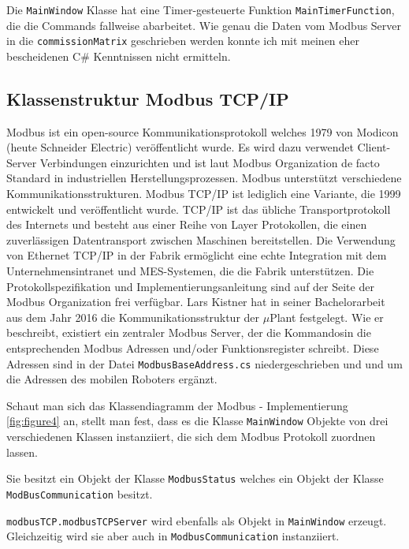 Die \verb|MainWindow| Klasse hat eine Timer-gesteuerte Funktion \verb|MainTimerFunction|, die die Commands
fallweise abarbeitet.
Wie genau die Daten vom Modbus Server in die \verb|commissionMatrix| geschrieben werden konnte ich mit meinen eher
bescheidenen C$\#$ Kenntnissen nicht ermitteln.
\newpage

\subsection{Klassenstruktur Modbus TCP/IP}\label{ModbusChapter}

Modbus ist ein open-source Kommunikationsprotokoll welches 1979 von Modicon (heute Schneider Electric) veröffentlicht wurde.
Es wird dazu verwendet Client-Server Verbindungen einzurichten und ist laut Modbus Organization de facto Standard in
industriellen Herstellungsprozessen.
Modbus unterstützt verschiedene Kommunikationsstrukturen.
Modbus TCP/IP ist lediglich eine Variante, die 1999 entwickelt und veröffentlicht wurde.
TCP/IP ist das übliche Transportprotokoll des Internets und besteht aus einer Reihe von Layer Protokollen, die einen
zuverlässigen Datentransport zwischen Maschinen bereitstellen.
Die Verwendung von Ethernet TCP/IP in der Fabrik ermöglicht eine echte Integration mit dem Unternehmensintranet und
MES-Systemen, die die Fabrik unterstützen.
Die Protokollspezifikation und Implementierungsanleitung sind auf der Seite der Modbus Organization frei verfügbar\cite{ModbusOrg}.
\newline
\newline
Lars Kistner \cite{LarsKistner2017} hat in seiner Bachelorarbeit aus dem Jahr 2016 die Kommunikationsstruktur der $\mu$Plant
festgelegt.
Wie er beschreibt, existiert ein zentraler Modbus Server, der die \glqq Kommandos\grqq in die entsprechenden Modbus
Adressen und/oder Funktionsregister schreibt.
Diese Adressen sind in der Datei \verb|ModbusBaseAddress.cs| niedergeschrieben und und um die Adressen des mobilen Roboters
ergänzt.

\clearpage
Schaut man sich das Klassendiagramm der Modbus - Implementierung \ref{fig:figure4} an, stellt man fest, dass es die Klasse
\verb|MainWindow| Objekte von drei verschiedenen Klassen instanziiert, die sich dem Modbus Protokoll zuordnen lassen.

Sie besitzt ein Objekt der Klasse \verb|ModbusStatus| welches ein Objekt der Klasse \\\verb|ModBusCommunication| besitzt.

\verb|modbusTCP.modbusTCPServer| wird ebenfalls als Objekt in \verb|MainWindow| erzeugt.
Gleichzeitig wird sie aber auch in \verb|ModbusCommunication| instanziiert.

